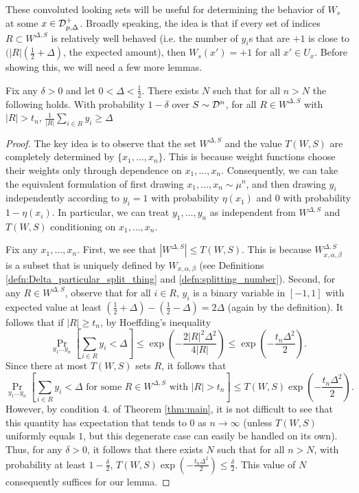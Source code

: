 These convoluted looking sets will be useful for determining the behavior of $W_s$ at some $x \in {\mathcal D}_{p, \Delta}^+$. Broadly speaking, the idea is that if every set of indices $R \subset W^{\Delta, S}$ is relatively well behaved (i.e. the number of $y_i$s that are $+1$ is close to $(|R|(\frac{1}{2} + \Delta)$, the expected amount), then $W_s(x') = +1$ for all $x' \in U_x$. Before showing this, we will need a few more lemmas.

\begin{lem}\label{lem:vc_mimicry}
Fix any $\delta > 0$ and let $0 <  \Delta < \frac{1}{2}$. There exists $N$ such that for all $n > N$ the following holds. With probability $1 - \delta$ over $S \sim {\mathcal D}^n$, for all $R \in W^{\Delta, S}$ with $|R| > t_n$, $\frac{1}{|R|} \sum_{i \in R} y_i \geq \Delta$ 
\end{lem}

\begin{proof}
The key idea is to observe that the set $W^{\Delta, S}$ and the value $T(W, S)$ are completely determined by $\{x_1, \dots, x_n\}$. This is because weight functions choose their weights only through dependence on $x_1, \dots, x_n$. Consequently, we can take the equivalent formulation of first drawing $x_1, \dots, x_n \sim \mu^n$, and then drawing $y_i$ independently according to $y_i = 1$ with probability $\eta(x_1)$ and $0$ with probability $1 - \eta(x_i)$. In particular, we can treat $y_1, \dots, y_n$ as independent from $W^{\Delta, S}$ and $T(W, S)$ conditioning on $x_1, \dots, x_n$. 

Fix any $x_1, \dots, x_n$. First, we see that $|W^{\Delta, S}| \leq T(W, S)$. This is because $W_{x, \alpha, \beta}^{\Delta, S}$ is a subset that is uniquely defined by $W_{x, \alpha, \beta}$ (see Definitions \ref{defn:Delta_particular_split_thing} and \ref{defn:splitting_number}). Second, for any $R \in W^{\Delta, S}$, observe that for all $i \in R$, $y_i$ is a binary variable in $[-1, 1]$ with expected value at least $(\frac{1}{2} + \Delta) - (\frac{1}{2} - \Delta) = 2\Delta$ (again by the definition). It follows that if $|R| \geq t_n$, by Hoeffding's inequality $$\Pr_{y_1 \dots y_n} [\sum_{i \in R} y_i < \Delta] \leq \exp \left( -\frac{2|R|^2\Delta^2}{4|R|} \right) \leq \exp \left( -\frac{t_n\Delta^2}{2} \right).$$ Since there at most $T(W, S)$ sets $R$, it follows that $$\Pr_{y_1 \dots y_n}[\sum_{i \in R} y_i < \Delta\text{ for some }R \in W^{\Delta, S}\text{ with }|R| > t_n] \leq T(W, S)\exp \left( -\frac{t_n\Delta^2}{2} \right).$$ However, by condition 4. of Theorem \ref{thm:main}, it is not difficult to see that this quantity has expectation that tends to $0$ as $n \to \infty$ (unless $T(W, S)$ uniformly equals $1$, but this degenerate case can easily be handled on its own). Thus, for any $\delta > 0$, it follows that there exists $N$ such that for all $n > N$, with probability at least $1 - \frac{\delta}{2}$, $T(W, S)\exp \left( -\frac{t_n\Delta^2}{2} \right) \leq \frac{\delta}{2}$. This value of $N$ consequently suffices for our lemma. 
\end{proof}

